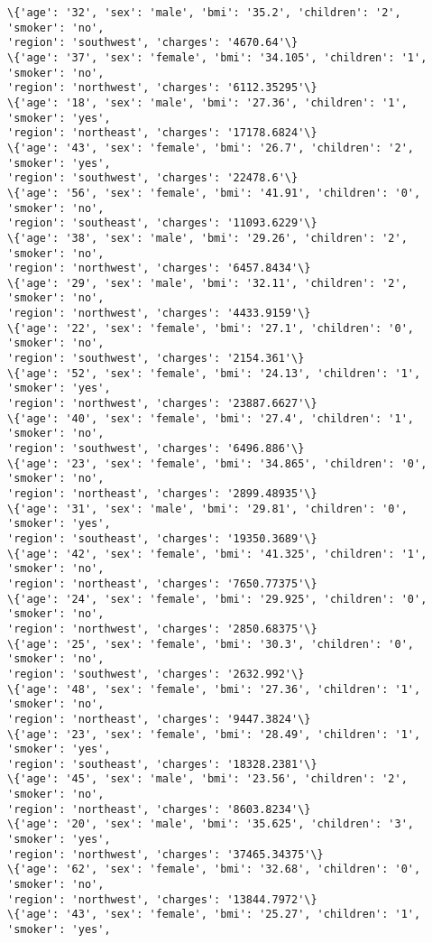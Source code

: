 \documentclass[11pt]{article}
\begin{document}
\begin{Verbatim}[commandchars=\\\{\}]
\{'age': '32', 'sex': 'male', 'bmi': '35.2', 'children': '2', 'smoker': 'no',
'region': 'southwest', 'charges': '4670.64'\}
\{'age': '37', 'sex': 'female', 'bmi': '34.105', 'children': '1', 'smoker': 'no',
'region': 'northwest', 'charges': '6112.35295'\}
\{'age': '18', 'sex': 'male', 'bmi': '27.36', 'children': '1', 'smoker': 'yes',
'region': 'northeast', 'charges': '17178.6824'\}
\{'age': '43', 'sex': 'female', 'bmi': '26.7', 'children': '2', 'smoker': 'yes',
'region': 'southwest', 'charges': '22478.6'\}
\{'age': '56', 'sex': 'female', 'bmi': '41.91', 'children': '0', 'smoker': 'no',
'region': 'southeast', 'charges': '11093.6229'\}
\{'age': '38', 'sex': 'male', 'bmi': '29.26', 'children': '2', 'smoker': 'no',
'region': 'northwest', 'charges': '6457.8434'\}
\{'age': '29', 'sex': 'male', 'bmi': '32.11', 'children': '2', 'smoker': 'no',
'region': 'northwest', 'charges': '4433.9159'\}
\{'age': '22', 'sex': 'female', 'bmi': '27.1', 'children': '0', 'smoker': 'no',
'region': 'southwest', 'charges': '2154.361'\}
\{'age': '52', 'sex': 'female', 'bmi': '24.13', 'children': '1', 'smoker': 'yes',
'region': 'northwest', 'charges': '23887.6627'\}
\{'age': '40', 'sex': 'female', 'bmi': '27.4', 'children': '1', 'smoker': 'no',
'region': 'southwest', 'charges': '6496.886'\}
\{'age': '23', 'sex': 'female', 'bmi': '34.865', 'children': '0', 'smoker': 'no',
'region': 'northeast', 'charges': '2899.48935'\}
\{'age': '31', 'sex': 'male', 'bmi': '29.81', 'children': '0', 'smoker': 'yes',
'region': 'southeast', 'charges': '19350.3689'\}
\{'age': '42', 'sex': 'female', 'bmi': '41.325', 'children': '1', 'smoker': 'no',
'region': 'northeast', 'charges': '7650.77375'\}
\{'age': '24', 'sex': 'female', 'bmi': '29.925', 'children': '0', 'smoker': 'no',
'region': 'northwest', 'charges': '2850.68375'\}
\{'age': '25', 'sex': 'female', 'bmi': '30.3', 'children': '0', 'smoker': 'no',
'region': 'southwest', 'charges': '2632.992'\}
\{'age': '48', 'sex': 'female', 'bmi': '27.36', 'children': '1', 'smoker': 'no',
'region': 'northeast', 'charges': '9447.3824'\}
\{'age': '23', 'sex': 'female', 'bmi': '28.49', 'children': '1', 'smoker': 'yes',
'region': 'southeast', 'charges': '18328.2381'\}
\{'age': '45', 'sex': 'male', 'bmi': '23.56', 'children': '2', 'smoker': 'no',
'region': 'northeast', 'charges': '8603.8234'\}
\{'age': '20', 'sex': 'male', 'bmi': '35.625', 'children': '3', 'smoker': 'yes',
'region': 'northwest', 'charges': '37465.34375'\}
\{'age': '62', 'sex': 'female', 'bmi': '32.68', 'children': '0', 'smoker': 'no',
'region': 'northwest', 'charges': '13844.7972'\}
\{'age': '43', 'sex': 'female', 'bmi': '25.27', 'children': '1', 'smoker': 'yes',

\end{Verbatim}
\end{document}
